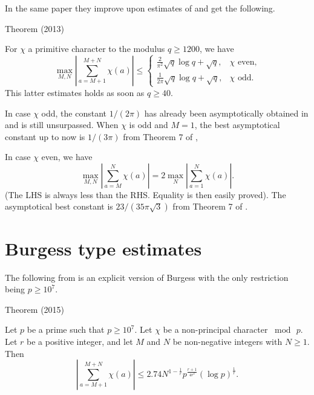 In the same paper they improve upon estimates of
\cite{Pomerance*11} and get the following.
\par 
\begin{thm}{Theorem (2013)}

  For $\chi$ a primitive character to the modulus $q \ge 1200$, we have
$$
\max_{M,N}\left|\sum_{a=M+1}^{M+N}\chi(a)\right|
\le
\begin{cases}
\frac{2}{\pi^2}\sqrt{q}\log q+\sqrt{q},&
  \text{$\chi$ even,}\\
\frac{1}{2\pi}\sqrt{q}\log q+\sqrt{q},&
  \text{$\chi$ odd}.
\end{cases}
$$
This latter estimates holds as soon as $q\ge40$.
\end{thm}


In case $\chi$ odd, the constant $1/(2\pi)$ has already
been asymptotically obtained in
\cite{Landau*18-3} and is still
unsurpassed. When $\chi$ is odd and $M=1$, the best asymptotical constant up to now is
$1/(3\pi)$ from Theorem 7 of
\cite{Granville-Soundararajan*07},

In case $\chi$ even, we have
$$
\max_{M,N}\left|\sum_{a=M}^N\chi(a)\right|
=2\max_{N}\left|\sum_{a=1}^N\chi(a)\right|.
$$
(The LHS is always less than the RHS. Equality is then easily proved).
The asymptotical best constant
is $23/(35\pi\sqrt{3})$ from Theorem 7 of
\cite{Granville-Soundararajan*07}.

\section{Burgess type estimates}


The following from 
\cite{Trevino*15-2}
is an explicit version of Burgess with the only restriction being
$p\ge 10^7$.
\par 
\begin{thm}{Theorem (2015)}

Let $p$ be a prime such that $p \ge 10^7$. Let $\chi$ be a non-principal character $\bmod{\,p}$. Let $r$ be a positive integer, and let $M$ and $N$ be non-negative integers with $N\ge 1$. Then
$$
\left|\sum_{a=M+1}^{M+N}\chi(a)\right|
\le 2.74 N^{1-\frac{1}{r}}
p^{\frac{r+1}{4r^2}}(\log{p})^{\frac{1}{r}}.
$$
\end{thm}

